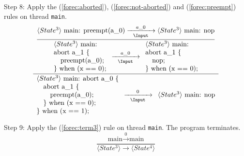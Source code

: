 \noindent
Step 8: Apply the (\ref{forec:aborted}), (\ref{forec:not-aborted}) and (\ref{forec:preempt})  
rules on thread \verb$main$.
\begin{equation*}
	\frac{
		\dfrac{
				\langle State^3 \rangle ~ \text{main: preempt(a\_0)}
					\xrightarrow[~~\Input~~]{a\_0}
				\langle State^3 \rangle ~ \text{main: nop}
			}{
				\begin{array}{l}
					\langle State^3 \rangle ~ \text{main:}		\\
					\text{abort a\_1 \{}						\\
					\text{~~~preempt(a\_0);}				\\
					\text{\} when (x == 0);}					
				\end{array}
					\xrightarrow[~~\Input~~]{a\_0} 
				\begin{array}{l}
					\langle State^3 \rangle ~ \text{main:}		\\
					\text{abort a\_1 \{}						\\
					\text{~~~nop;}					\\
					\text{\} when (x == 0);}					
				\end{array}
			}
		}{
			\begin{array}{l}
				\langle State^3 \rangle ~ \text{main: abort a\_0 \{}	\\
				\text{~~~abort a\_1 \{}									\\
				\text{~~~~~~preempt(a\_0);}								\\
				\text{~~~\} when (x == 0);}								\\
				\text{\} when (x == 1);}
			\end{array}
				\xrightarrow[~~\Input~~]{0} 
			\begin{array}{l}
				\langle State^3 \rangle ~ \text{main: nop}
			\end{array}
		}
\end{equation*}

\noindent
Step 9: Apply the (\ref{forec:term3}) rule on thread \verb$main$.
The program terminates.
\begin{equation*}
	\frac{
			\text{main} \xrightarrow{~~0~~} \text{main}
		}{
			\langle State^3 \rangle \xrightarrow{~~~~~} \langle State^4 \rangle
		}
\end{equation*}
